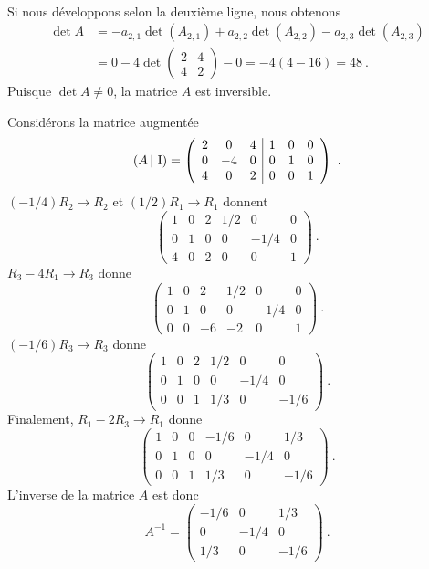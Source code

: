{\\
 Si nous développons selon la deuxième ligne, nous obtenons
\begin{align*}
\det A  &= -a_{2,1} \det(A_{2,1}) + a_{2,2} \det(A_{2,2})
- a_{2,3}\det(A_{2,3}) \\
&= 0 - 4 \det\begin{pmatrix}2 & 4 \\ 4 & 2 \end{pmatrix} - 0
= -4( 4-16) = 48 \ .
\end{align*}
Puisque $\det A \neq 0$, la matrice $A$ est inversible.

 Considérons la matrice augmentée
\[
(A\,|\, \operatorname{I}) =
\left(
\begin{array}{ccc|ccc}
2 & 0 & 4 & 1 & 0 & 0 \\
0 & -4 & 0 & 0 & 1 & 0 \\
4 & 0 & 2 & 0 & 0 & 1
\end{array} \right) \ .
\]
$(-1/4) R_2 \to R_2$ et $(1/2)R_1 \to R_1$ donnent
\[
\left(
\begin{array}{ccc|ccc}
1 & 0 & 2 & 1/2 & 0 & 0 \\
0 & 1 & 0 & 0 & -1/4 & 0 \\
4 & 0 & 2 & 0 & 0 & 1 
\end{array} \right) \ .
\]
$R_3 - 4 R_1 \to R_3$ donne
\[
\left(
\begin{array}{ccc|ccc}
1 & 0 & 2 & 1/2 & 0 & 0 \\
0 & 1 & 0 & 0 & -1/4 & 0 \\
0 & 0 & -6 & -2 & 0 & 1 
\end{array} \right) \ .
\]
$(-1/6) R_3 \to R_3$ donne
\[
\left(
\begin{array}{ccc|ccc}
1 & 0 & 2 & 1/2 & 0 & 0 \\
0 & 1 & 0 & 0 & -1/4 & 0 \\
0 & 0 & 1 & 1/3 & 0 & -1/6 
\end{array} \right) \ .
\]
Finalement, $R_1 -2 R_3 \to R_1$ donne
\[
\left(
\begin{array}{ccc|ccc}
1 & 0 & 0 & -1/6 & 0 & 1/3 \\
0 & 1 & 0 & 0 & -1/4 & 0 \\
0 & 0 & 1 & 1/3 & 0 & -1/6 
\end{array} \right)  \ .
\]
L'inverse de la matrice $A$ est donc
\[
A^{-1} = \begin{pmatrix}
-1/6 & 0 & 1/3 \\
0 & -1/4 & 0 \\
1/3 & 0 & -1/6 
\end{pmatrix} \ .
\]

}
